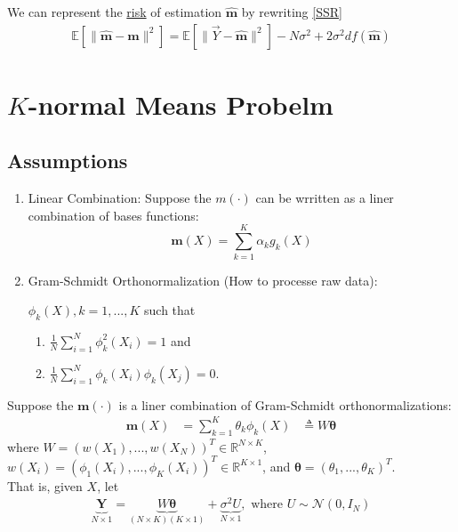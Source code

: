 \documentclass[11pt]{elegantbook}
\begin{document}
We can represent the \underline{risk} of estimation $\hat{\boldsymbol{m}}$ by rewriting \ref{SSR}
\begin{equation}
    \begin{aligned}
        \mathbb{E}\left[\|\hat{\boldsymbol{m}}-\boldsymbol{m}\|^2\right]=\mathbb{E}\left[\|\vec{Y}-\hat{\boldsymbol{m}}\|^2\right]-N\sigma^2+2\sigma^2 df(\hat{\boldsymbol{m}})
    \end{aligned}
    \nonumber
\end{equation}

\section{$K$-normal Means Probelm}
\subsection{Assumptions}
\begin{assumption}
    \begin{enumerate}
        \item Linear Combination: Suppose the $m(\cdot)$ can be wrritten as a liner combination of bases functions:
        $$\boldsymbol{m}(X)=\sum_{k=1}^K \alpha_k g_k(X)$$
        \item Gram-Schmidt Orthonormalization (How to processe raw data):
        \begin{definition}\label{GSO}
            \normalfont
            $\phi_{k}(X), k=1,...,K$ such that
            \begin{enumerate}[(1).]
                \item $\frac{1}{N}\sum_{i=1}^N\phi_{k}^2(X_i)=1$ and
                \item $\frac{1}{N}\sum_{i=1}^N\phi_{k}(X_i)\phi_{k}(X_j)=0$.
            \end{enumerate}
        \end{definition}
    \end{enumerate}
    Suppose the $\boldsymbol{m}(\cdot)$ is a liner combination of Gram-Schmidt orthonormalizations:
    \begin{equation}
        \begin{aligned}
            \boldsymbol{m}(X)&=\sum_{k=1}^K \theta_k \phi_{k}(X)
            &\triangleq W \boldsymbol{\theta}
        \end{aligned}
        \nonumber
    \end{equation}
    where $W=\left(w(X_1),...,w(X_N)\right)^T\in \mathbb{R}^{N\times K}$, $w(X_i)=\left(\phi_1(X_i),...,\phi_K(X_i)\right)^T\in \mathbb{R}^{K\times 1}$, and $\boldsymbol{\theta}=\left(\theta_1,...,\theta_K\right)^T$.\\
    That is, given $X$, let
    \begin{equation}
        \begin{aligned}
            \underbrace{\boldsymbol{Y}}_{N\times 1}=\underbrace{W \boldsymbol{\theta}}_{(N\times K) (K\times 1)}+\underbrace{\sigma^2 U}_{N\times 1}, \text{ where }U\sim \mathcal{N}(0,I_N)
        \end{aligned}
        \nonumber
    \end{equation}
\end{assumption}
\end{document}
